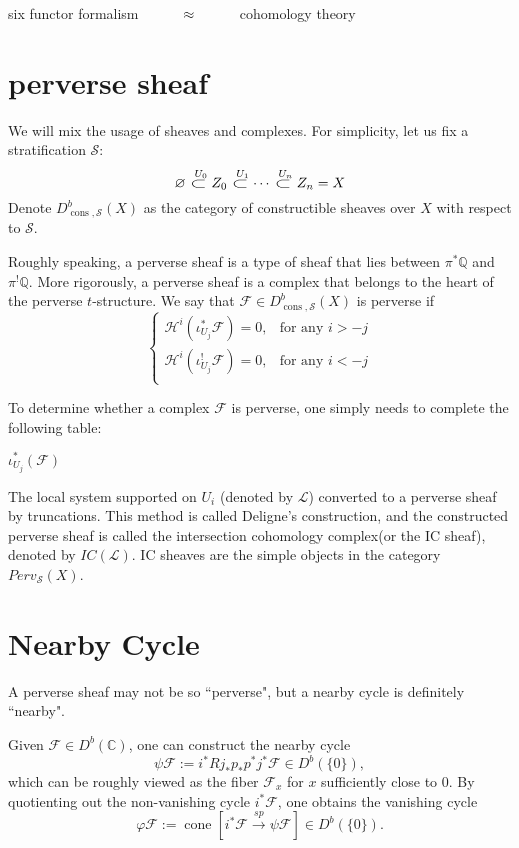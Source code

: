 \documentclass[UTF8]{amsart}
\numberwithin{equation}{section}
\theoremstyle{plain}
\numberwithin{equation}{section}
\theoremstyle{remark}
\DeclareMathOperator{\constructable}{\operatorname{cons}}
\DeclareMathOperator{\cone}{\operatorname{cone}}
\begin{document}
six functor formalism $\hspace{10mm}\approx\hspace{10mm}$ cohomology theory

\section{perverse sheaf}

We will mix the usage of sheaves and complexes. For simplicity, let us fix a stratification $\mathcal{S}$:
\newcommand\largesubset{\mathrel{\scalebox{1.5}[1]{\(\subset\)}}}
$$\varnothing \overset{\;\,U_0}{\largesubset} Z_0 \overset{\;\,U_1}{\largesubset}\cdots  \overset{\;\,U_n}{\largesubset} Z_n = X$$
Denote $D_{\constructable,\mathcal{S}}^{b}(X)$ as the category of constructible sheaves over $X$ with respect to $\mathcal{S}$.

Roughly speaking, a perverse sheaf is a type of sheaf that lies between $\pi^* \mathbb{Q}$ and $\pi^! \mathbb{Q}$. More rigorously, a perverse sheaf is a complex that belongs to the heart of the perverse $t$-structure. We say that $\mathcal{F} \in D_{\constructable,\mathcal{S}}^{b}(X)$ is perverse if 
$$
\begin{cases}
\mathcal{H}^i\left(\iota_{U_j}^* \mathcal{F}\right) = 0, & \text{for any } i > -j\\
\mathcal{H}^i\left(\iota_{U_j}^! \mathcal{F}\right) = 0, & \text{for any } i < -j\\
\end{cases}
$$


To determine whether a complex $\mathcal{F}$ is perverse, one simply needs to complete the following table:

$\iota_{U_j}^*(\mathcal{F})$

The local system supported on $U_i$ (denoted by $\mathcal{L}$) converted to a perverse sheaf by truncations. This method is called Deligne's construction, and the constructed perverse sheaf is called the intersection cohomology complex(or the IC sheaf), denoted by $IC(\mathcal{L})$. IC sheaves are the simple objects in the category $Perv_{\mathcal{S}}(X)$.


\section{Nearby Cycle}
A perverse sheaf may not be so ``perverse", but a nearby cycle is definitely ``nearby".

Given $\mathcal{F} \in D^b(\mathbb{C})$, one can construct the nearby cycle 
$$\psi \mathcal{F}:= i^* Rj_* p_* p^* j^* \mathcal{F} \in D^b(\{0\}),$$
 which can be roughly viewed as the fiber $\mathcal{F}_x$ for $x$ sufficiently close to $0$. By quotienting out the non-vanishing cycle $i^*\mathcal{F}$, one obtains the vanishing cycle $$\varphi \mathcal{F}:= \cone \left[ i^*\mathcal{F} \overset{sp}{\longrightarrow} \psi \mathcal{F} \right] \in D^b(\{0\}).$$
 
\end{document}
